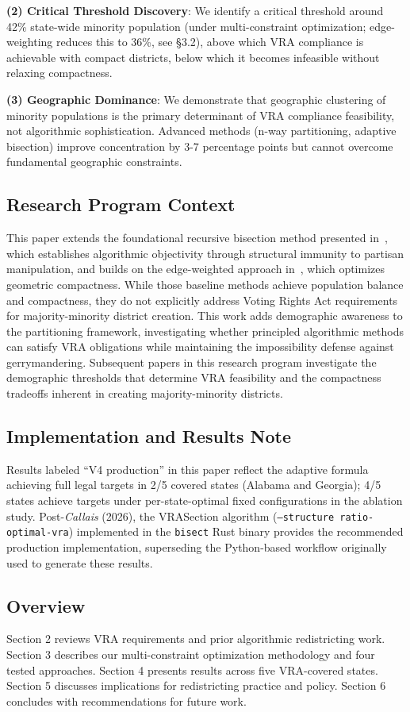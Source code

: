 \textbf{(2) Critical Threshold Discovery}: We identify a critical threshold around 42\% state-wide minority population (under multi-constraint optimization; edge-weighting reduces this to 36\%, see §3.2), above which VRA compliance is achievable with compact districts, below which it becomes infeasible without relaxing compactness.

\textbf{(3) Geographic Dominance}: We demonstrate that geographic clustering of minority populations is the primary determinant of VRA compliance feasibility, not algorithmic sophistication. Advanced methods (n-way partitioning, adaptive bisection) improve concentration by 3-7 percentage points but cannot overcome fundamental geographic constraints.

\subsection{Research Program Context}

This paper extends the foundational recursive bisection method presented in~\cite{della-libera-recursive-bisection}, which establishes algorithmic objectivity through structural immunity to partisan manipulation, and builds on the edge-weighted approach in~\cite{della-libera-edge-weighted}, which optimizes geometric compactness. While those baseline methods achieve population balance and compactness, they do not explicitly address Voting Rights Act requirements for majority-minority district creation. This work adds demographic awareness to the partitioning framework, investigating whether principled algorithmic methods can satisfy VRA obligations while maintaining the impossibility defense against gerrymandering. Subsequent papers in this research program investigate the demographic thresholds that determine VRA feasibility and the compactness tradeoffs inherent in creating majority-minority districts.

\subsection{Implementation and Results Note}

Results labeled ``V4 production'' in this paper reflect the adaptive formula achieving full legal targets in 2/5 covered states (Alabama and Georgia); 4/5 states achieve targets under per-state-optimal fixed configurations in the ablation study. Post-\emph{Callais} (2026), the VRASection algorithm (\texttt{--structure ratio-optimal-vra}) implemented in the \texttt{bisect} Rust binary provides the recommended production implementation, superseding the Python-based workflow originally used to generate these results.

\subsection{Overview}

Section 2 reviews VRA requirements and prior algorithmic redistricting work. Section 3 describes our multi-constraint optimization methodology and four tested approaches. Section 4 presents results across five VRA-covered states. Section 5 discusses implications for redistricting practice and policy. Section 6 concludes with recommendations for future work.
